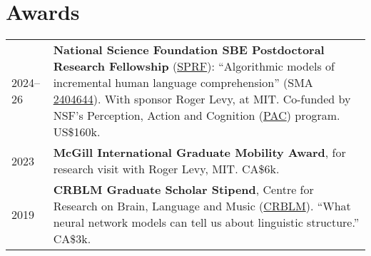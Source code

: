 \documentclass[11pt,a4paper]{article}
\begin{document}

  \section{Awards}
  \begin{longtable}{p{1.7cm}|p{15cm}}
    \textsc{2024--26}&%
      \textbf{National Science Foundation SBE Postdoctoral Research Fellowship} (\href{https://new.nsf.gov/funding/opportunities/sbe-postdoctoral-research-fellowships-sprf}{SPRF}): ``Algorithmic models of incremental human language comprehension''
      (SMA \href{https://www.nsf.gov/awardsearch/showAward?AWD_ID=2404644&}{2404644}). 
      With sponsor Roger Levy, at MIT\@.
      Co-funded by NSF's Perception, Action and Cognition (\href{https://new.nsf.gov/funding/opportunities/perception-action-cognition-pac}{PAC}) program.
      US\$160k.\\
    \textsc{2023}&%
      \textbf{McGill International Graduate Mobility Award},
      for research visit with Roger Levy, MIT\@. CA\$6k.\\
    \textsc{2019}&%
      \textbf{CRBLM Graduate Scholar Stipend}, Centre for Research on Brain, Language
      and Music (\href{https://crblm.ca/}{CRBLM}). ``What neural network models
      can tell us about linguistic structure.'' CA\$3k.\\
  \end{longtable}
\end{document}
